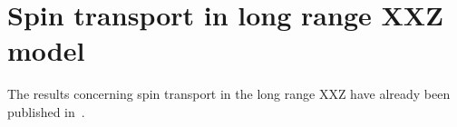 \chapter{Spin transport in long range XXZ model}
\thispagestyle{chapterBeginStyle}

The results concerning spin transport in the long range XXZ have already been published in~\textcite{Mierzejewski2023}.